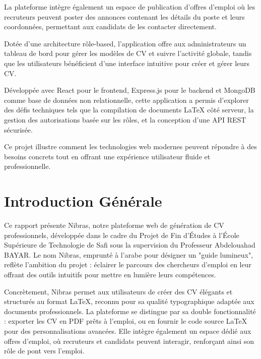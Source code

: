 \documentclass{report}
\begin{document}
La plateforme intègre également un espace de publication d'offres d'emploi où les recruteurs peuvent poster des annonces contenant les détails du poste et leurs coordonnées, permettant aux candidats de les contacter directement.  

Dotée d'une architecture rôle-based, l'application offre aux administrateurs un tableau de bord pour gérer les modèles de CV et suivre l'activité globale, tandis que les utilisateurs bénéficient d'une interface intuitive pour créer et gérer leurs CV.  

Développée avec React pour le frontend, Express.js pour le backend et MongoDB comme base de données non relationnelle, cette application a permis d'explorer des défis techniques tels que la compilation de documents LaTeX côté serveur, la gestion des autorisations basée sur les rôles, et la conception d'une API REST sécurisée.  

Ce projet illustre comment les technologies web modernes peuvent répondre à des besoins concrets tout en offrant une expérience utilisateur fluide et professionnelle.  

\vspace*{\fill} %

{ %
\titleformat{\section}{\normalfont\Huge}{}{0pt}{}  %
\tableofcontents
\listoffigures  %
} %
\clearpage

\section{Introduction Générale}
\justifying
\clearpage

\vspace*{\fill} %
Ce rapport présente Nibras, notre plateforme web de génération de CV professionnels, développée dans le cadre du Projet de Fin d'Études à l'École Supérieure de Technologie de Safi sous la supervision du Professeur Abdelouahad BAYAR. Le nom Nibras, emprunté à l'arabe pour désigner un "guide lumineux", reflète l'ambition du projet : éclairer le parcours des chercheurs d'emploi en leur offrant des outils intuitifs pour mettre en lumière leurs compétences.

Concrètement, Nibras permet aux utilisateurs de créer des CV élégants et structurés au format LaTeX, reconnu pour sa qualité typographique adaptée aux documents professionnels. La plateforme se distingue par sa double fonctionnalité : exporter les CV en PDF prêts à l'emploi, ou en fournir le code source LaTeX pour des personnalisations avancées. Elle intègre également un espace dédié aux offres d'emploi, où recruteurs et candidats peuvent interagir, renforçant ainsi son rôle de pont vers l'emploi.
\end{document}
